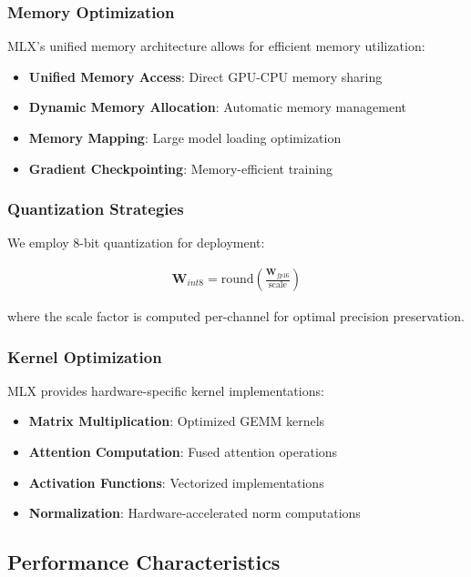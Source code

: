 \subsubsection{Memory Optimization}

MLX's unified memory architecture allows for efficient memory utilization:

\begin{itemize}
    \item \textbf{Unified Memory Access}: Direct GPU-CPU memory sharing
    \item \textbf{Dynamic Memory Allocation}: Automatic memory management
    \item \textbf{Memory Mapping}: Large model loading optimization
    \item \textbf{Gradient Checkpointing}: Memory-efficient training
\end{itemize}

\subsubsection{Quantization Strategies}

We employ 8-bit quantization for deployment:

\begin{align}
\mathbf{W}_{int8} = \text{round}\left(\frac{\mathbf{W}_{fp16}}{\text{scale}}\right)
\end{align}

where the scale factor is computed per-channel for optimal precision preservation.

\subsubsection{Kernel Optimization}

MLX provides hardware-specific kernel implementations:

\begin{itemize}
    \item \textbf{Matrix Multiplication}: Optimized GEMM kernels
    \item \textbf{Attention Computation}: Fused attention operations
    \item \textbf{Activation Functions}: Vectorized implementations
    \item \textbf{Normalization}: Hardware-accelerated norm computations
\end{itemize}

\subsection{Performance Characteristics}

